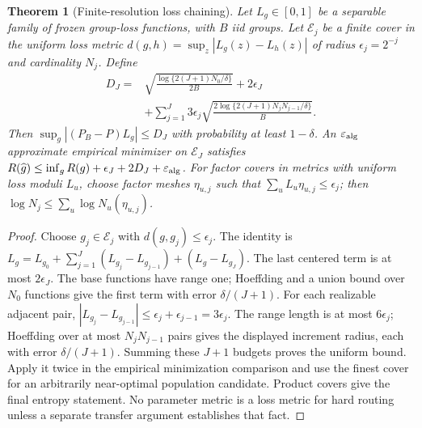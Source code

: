 \documentclass[11pt,a4paper]{article}
\numberwithin{equation}{section}
\newtheorem{theorem}{Theorem}[section]
\theoremstyle{definition}\newtheorem{definition}[theorem]{Definition}
\theoremstyle{remark}\newtheorem{remark}[theorem]{Remark}
\begin{document}
\begin{theorem}[Finite-resolution loss chaining]\label{thm:entropyintegral}
Let $L_g\in[0,1]$ be a separable family of frozen group-loss functions, with
$B$ iid groups. Let $\mathcal E_j$ be a finite cover in the uniform loss metric
$d(g,h)=\sup_z|L_g(z)-L_h(z)|$ of radius $\epsilon_j=2^{-j}$ and cardinality $N_j$.
Define
\begin{align*}
 D_J={}&\sqrt{\frac{\log\{2(J+1)N_0/\delta\}}{2B}}+2\epsilon_J\\
 &+\sum_{j=1}^J3\epsilon_j
 \sqrt{\frac{2\log\{2(J+1)N_jN_{j-1}/\delta\}}{B}}.
\end{align*}
Then $\sup_g|(P_B-P)L_g|\le D_J$ with probability at least $1-\delta$.
An $\varepsilon_{\rm alg}$ approximate empirical minimizer on $\mathcal E_J$
satisfies
$R(\widehat g)\le\inf_gR(g)+\epsilon_J+2D_J+\varepsilon_{\rm alg}$.
For factor covers in metrics with uniform loss moduli $L_u$, choose factor
meshes $\eta_{u,j}$ such that $\sum_uL_u\eta_{u,j}\le\epsilon_j$; then
$\log N_j\le\sum_u\log N_u(\eta_{u,j})$.
\end{theorem}
\begin{proof}
Choose $g_j\in\mathcal E_j$ with $d(g,g_j)\le\epsilon_j$.
The identity is
$L_g=L_{g_0}+\sum_{j=1}^J(L_{g_j}-L_{g_{j-1}})+(L_g-L_{g_J})$.
The last centered term is at most $2\epsilon_J$.
The base functions have range one; Hoeffding and a union bound over $N_0$
functions give the first term with error $\delta/(J+1)$.
For each realizable adjacent pair,
$|L_{g_j}-L_{g_{j-1}}|\le\epsilon_j+\epsilon_{j-1}=3\epsilon_j$.
The range length is at most $6\epsilon_j$; Hoeffding over at most
$N_jN_{j-1}$ pairs gives the displayed increment radius, each with error
$\delta/(J+1)$. Summing these $J+1$ budgets proves the uniform bound.
Apply it twice in the empirical minimization comparison and use the finest
cover for an arbitrarily near-optimal population candidate. Product covers give
the final entropy statement. No parameter metric is a loss metric for hard
routing unless a separate transfer argument establishes that fact.
\end{proof}
\end{document}
